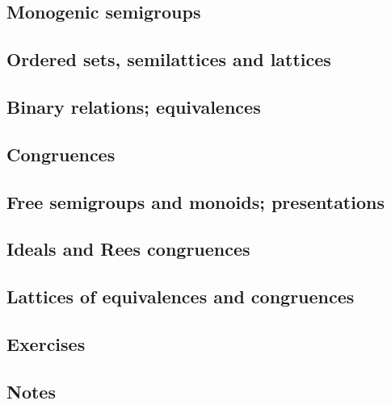 \subsection[2]{Monogenic semigroups}
\subsection[3]{Ordered sets, semilattices and lattices}
\subsection[4]{Binary relations; equivalences}
\subsection[5]{Congruences}
\subsection[6]{Free semigroups and monoids; presentations}
\subsection[7]{Ideals and Rees congruences}
\subsection[8]{Lattices of equivalences and congruences}
\subsection[9]{Exercises}
\subsection[10]{Notes}
